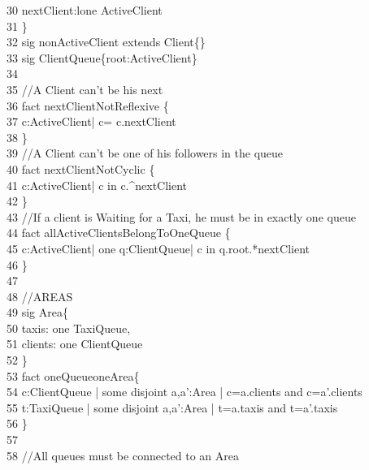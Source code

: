     30	\-\qquad nextClient:lone ActiveClient\\
    31	\}\\
    32	{\color{blue}sig} nonActiveClient {\color{blue}extends} Client\{\}\\
    33	{\color{blue}sig} ClientQueue\{root:ActiveClient\}\\
    34	\\
    35	{\color{green}//A Client can't be his next}\\
    36	{\color{blue}fact} nextClientNotReflexive \{ \\
    37	\- c:ActiveClient| c= c.nextClient\\
    38	\}\\
    39	{\color{green}//A Client can't be one of his followers in the queue}\\
    40	{\color{blue}fact} nextClientNotCyclic \{\\
    41	\- c:ActiveClient| c {\color{blue}in} c.\string^nextClient\\
    42	\} \\
    43	{\color{green}//If a client is Waiting for a Taxi, he must be in exactly one queue}\\
    44	{\color{blue}fact} allActiveClientsBelongToOneQueue \{\\
    45	\- c:ActiveClient| {\color{blue}one} q:ClientQueue| c {\color{blue}in} q.root.*nextClient\\
    46	\}\\
    47	\\
    48	{\color{green}//AREAS}\\
    49	{\color{blue}sig} Area\{\\
    50	\-\qquad taxis: {\color{blue}one} TaxiQueue, \\
    51	\-\qquad clients: {\color{blue}one} ClientQueue\\
    52	\}\\
    53	{\color{blue}fact} oneQueueoneArea\{\\
    54	\- c:ClientQueue | {\color{blue}some} disjoint a,a':Area | c=a.clients  {\color{blue}and}  c=a'.clients\\
    55	\- t:TaxiQueue | {\color{blue}some} disjoint a,a':Area | t=a.taxis  {\color{blue}and}  t=a'.taxis\\
    56	\}\\
    57	\\
    58	{\color{green}//All queues must be connected to an Area}\\
